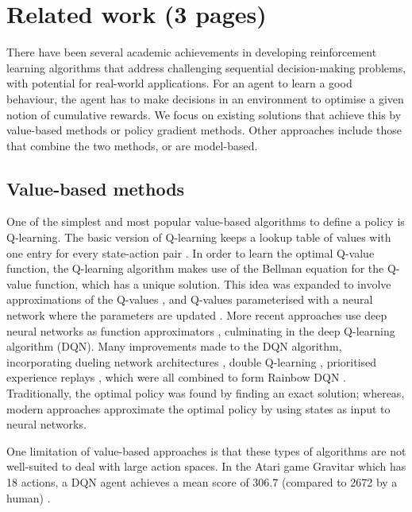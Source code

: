 \documentclass[12pt,a4paper]{article}
\begin{document}
\newpage
\section{Related work (3 pages)}
\label{section:related-work}
There have been several academic achievements in developing reinforcement learning algorithms that address challenging sequential decision-making problems, with  potential for real-world applications. For an agent to learn a good behaviour, the agent has to make decisions in an environment to optimise a given notion of cumulative rewards. We focus on existing solutions that achieve this by value-based methods or policy gradient methods. Other approaches include those that combine the two methods, or are model-based.

\subsection{Value-based methods}
One of the simplest and most popular value-based algorithms to define a policy is Q-learning. The basic version of Q-learning keeps a lookup table of values with one entry for every state-action pair \cite{DBLP:journals/corr/abs-1811-12560}. In order to learn the optimal Q-value function, the Q-learning algorithm makes use of the Bellman equation for the Q-value function, which has a unique solution. This idea was expanded to involve approximations of the Q-values \cite{10.5555/2998828.2998976}, and Q-values parameterised with a neural network where the parameters are updated \cite{10.1007/11564096_32}. More recent approaches use deep neural networks as function approximators \cite{Mnih2015}, culminating in the deep Q-learning algorithm (DQN). Many improvements made to the DQN algorithm, incorporating dueling network architectures \cite{}, double Q-learning \cite{}, prioritised experience replays \cite{}, which were all combined to form Rainbow DQN \cite{}. Traditionally, the optimal policy was found by finding an exact solution; whereas, modern approaches approximate the optimal policy by using states as input to neural networks. 

One limitation of value-based approaches is that these types of algorithms are not well-suited to deal with large action spaces. In the Atari game Gravitar which has 18 actions, a DQN agent achieves a mean score of 306.7 (compared to 2672 by a human) \cite{Mnih2015}. 
\end{document}
